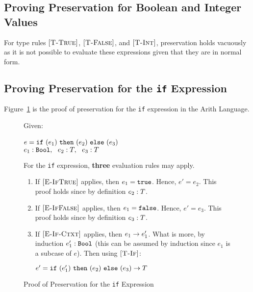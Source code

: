 \documentclass{report}
\newcommand{\rel}[1]{\mbox{\sc [#1]}}
\begin{document}
\subsection{Proving Preservation for Boolean and Integer Values}

For type rules $\rel{T-True}$, $\rel{T-False}$, and $\rel{T-Int}$, preservation holds vacuously as it is not possible to evaluate these expressions given that they are in normal form.

\subsection{Proving Preservation for the \texttt{if} Expression}

Figure~\ref{fig:ifProofPreservation} is the proof of preservation for the \texttt{if} expression in the Arith Language.

\begin{figure}[ht!]
Given:
\begin{center}
   $e = \mbox{\tt if}~({e_1})~\mbox{\tt then}~({e_2})~\mbox{\tt else}~({e_3})$~\\
   ${e_1} : {\mbox{\tt Bool}},~~{e_2} : {T},~~{e_3} : {T}$
\end{center}
For the \texttt{if} expression, \textbf{three} evaluation rules may apply.
\begin{enumerate}

    \item If $\rel{E-IfTrue}$ applies, then $e_1 = \mbox{\tt true}$.  Hence, $e' = e_2$.  This proof holds since by definition ${e_2} : {T}$.
      
    \item If $\rel{E-IfFalse}$ applies, then $e_1 = \mbox{\tt false}$.  Hence, $e' = e_3$.  This proof holds since by definition ${e_3} : {T}$.
    
    \item If $\rel{E-If-Ctxt}$ applies, then ${e_1} \rightarrow {e'_1}$.  What is more, by induction ${e'_1} : {\mbox{\tt Bool}}$ (this can be assumed by induction since $e_1$ is a subcase of $e$).  Then using $\rel{T-If}$:
    
    \begin{center}
      ${e' = \mbox{\tt if}~({e'_1})~\mbox{\tt then}~({e_2})~\mbox{\tt else}~({e_3})} \rightarrow {T}$
    \end{center}
	
	\end{enumerate}
	
  \caption{Proof of Preservation for the \texttt{if} Expression}\label{fig:ifProofPreservation}
\end{figure} 
\end{document}
